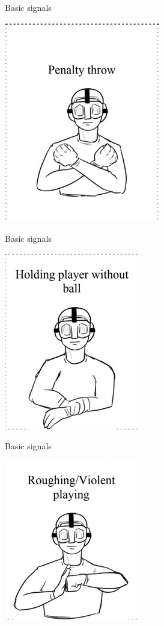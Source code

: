 \begin{frame}{Basic signals}
    \begin{center}
        \includegraphics[scale=0.8]{penaltyShotSignal}
    \end{center}
\end{frame}

\begin{frame}{Basic signals}
    \begin{center}
        \includegraphics[scale=0.8]{holdingSignal}
    \end{center}
\end{frame}

\begin{frame}{Basic signals}
    \begin{center}
        \includegraphics[scale=0.8]{violentGameSignal}
    \end{center}
\end{frame}

